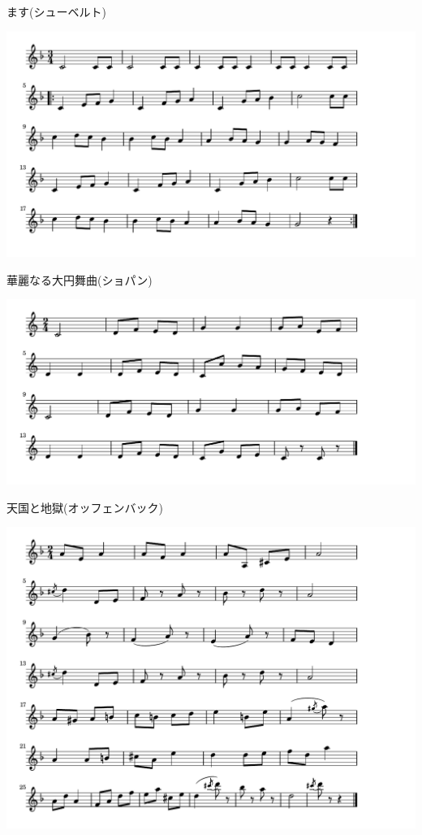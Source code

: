 \documentclass[a4paper]{ltjsarticle}
\begin{document}
\vspace{-10mm} \hspace{10mm}
ます(シューベルト)

\includegraphics[clip]{kareinaru_crop.pdf}

\vspace{-10mm} \hspace{10mm}
華麗なる大円舞曲(ショパン)

\includegraphics[clip]{tengokujigoku_crop.pdf}

\vspace{-10mm} \hspace{10mm}
天国と地獄(オッフェンバック)

\includegraphics[clip]{csikospost_crop.pdf}
\end{document}

